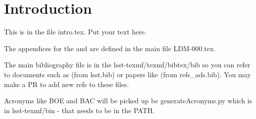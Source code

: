 \section{Introduction} \label{sec:intro}
This is in the file intro.tex. Put your text here.

The appendices for the  and  are defined in the main file LDM-000.tex.

The main bibliography file is in the lsst-texmf/texmf/bibtex/bib so you can refer to documents such as  (from lsst.bib)  or papers like \cite{2008arXiv0805.2366I} (from refs\_ads.bib). You may make a PR to add new refs to these files.

Acronyms like BOE and BAC will be picked up be generateAcronyms.py which is in lsst-texmf/bin - that needs to be in the PATH.

